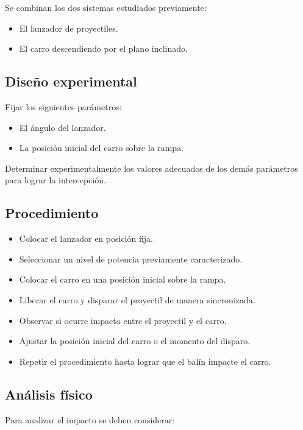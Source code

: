Se combinan los dos sistemas estudiados previamente:

\begin{itemize}
\item El lanzador de proyectiles.
\item El carro descendiendo por el plano inclinado.
\end{itemize}

\subsection*{Diseño experimental}

Fijar los siguientes parámetros:

\begin{itemize}
\item El ángulo del lanzador.
\item La posición inicial del carro sobre la rampa.
\end{itemize}

Determinar experimentalmente los valores adecuados de los demás parámetros para lograr la intercepción.

\subsection*{Procedimiento}

\begin{itemize}
\item Colocar el lanzador en posición fija.
\item Seleccionar un nivel de potencia previamente caracterizado.
\item Colocar el carro en una posición inicial sobre la rampa.
\item Liberar el carro y disparar el proyectil de manera sincronizada.
\item Observar si ocurre impacto entre el proyectil y el carro.
\item Ajustar la posición inicial del carro o el momento del disparo.
\item Repetir el procedimiento hasta lograr que el balín impacte el carro.
\end{itemize}

\subsection*{Análisis físico}

Para analizar el impacto se deben considerar:

